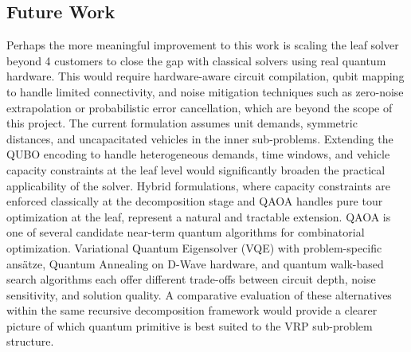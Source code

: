\documentclass[a4paper]{report}
\begin{document}
{\begin{itemize}
\begin{itemize}
\section{Future Work}
Perhaps the more meaningful improvement to this work is scaling the leaf solver beyond 4 customers to close the gap with classical solvers using real quantum hardware. This would require hardware-aware circuit compilation, qubit mapping to handle limited connectivity, and noise mitigation techniques such as zero-noise extrapolation or probabilistic error cancellation, which are beyond the scope of this project.
The current formulation assumes unit demands, symmetric distances, and uncapacitated vehicles in the inner sub-problems. Extending the QUBO encoding to handle heterogeneous demands, time windows, and vehicle capacity constraints at the leaf level would significantly broaden the practical applicability of the solver. Hybrid formulations, where capacity constraints are enforced classically at the decomposition stage and QAOA handles pure tour optimization at the leaf, represent a natural and tractable extension.
 QAOA is one of several candidate near-term quantum algorithms for combinatorial optimization. Variational Quantum Eigensolver (VQE) with problem-specific ansätze, Quantum Annealing on D-Wave hardware, and quantum walk-based search algorithms each offer different trade-offs between circuit depth, noise sensitivity, and solution quality. A comparative evaluation of these alternatives within the same recursive decomposition framework would provide a clearer picture of which quantum primitive is best suited to the VRP sub-problem structure.


















\begin{appendices}





\end{appendices}
\end{itemize}
\end{itemize}}
\end{document}
